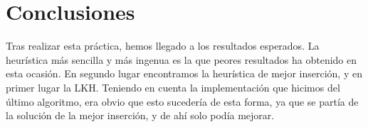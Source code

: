 \documentclass[a4paper, 11pt]{article}
\begin{document}
\section{Conclusiones}
Tras realizar esta práctica, hemos llegado a los resultados esperados. La heurística más sencilla y más ingenua es la que peores resultados ha obtenido en esta ocasión. En segundo lugar encontramos la heurística de mejor inserción, y en primer lugar la LKH. Teniendo en cuenta la implementación que hicimos del último algoritmo, era obvio que esto sucedería de esta forma, ya que se partía de la solución de la mejor inserción, y de ahí solo podía mejorar.
\end{document}

